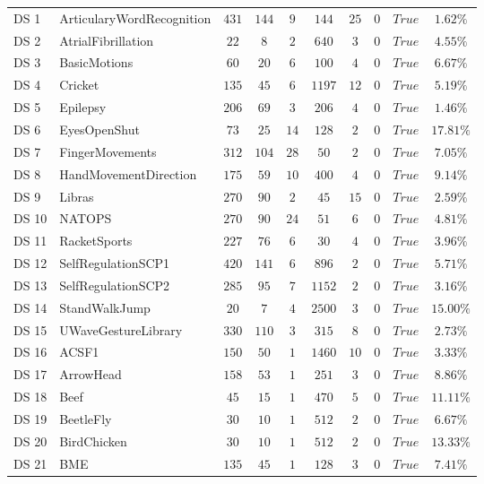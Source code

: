 {\begin{longtable}{|ll|cccccccc|}
		DS 1 & ArticularyWordRecognition & $431$ & $144$ & $9$ & $144$ & $25$ & $0$ & $True$ & $1.62\%$ \\
		DS 2 & AtrialFibrillation & $22$ & $8$ & $2$ & $640$ & $3$ & $0$ & $True$ & $4.55\%$ \\
		DS 3 & BasicMotions & $60$ & $20$ & $6$ & $100$ & $4$ & $0$ & $True$ & $6.67\%$ \\
		DS 4 & Cricket & $135$ & $45$ & $6$ & $1197$ & $12$ & $0$ & $True$ & $5.19\%$ \\
		DS 5 & Epilepsy & $206$ & $69$ & $3$ & $206$ & $4$ & $0$ & $True$ & $1.46\%$ \\
		DS 6 & EyesOpenShut & $73$ & $25$ & $14$ & $128$ & $2$ & $0$ & $True$ & $17.81\%$ \\
		DS 7 & FingerMovements & $312$ & $104$ & $28$ & $50$ & $2$ & $0$ & $True$ & $7.05\%$ \\
		DS 8 & HandMovementDirection & $175$ & $59$ & $10$ & $400$ & $4$ & $0$ & $True$ & $9.14\%$ \\
		DS 9 & Libras & $270$ & $90$ & $2$ & $45$ & $15$ & $0$ & $True$ & $2.59\%$ \\
		DS 10 & NATOPS & $270$ & $90$ & $24$ & $51$ & $6$ & $0$ & $True$ & $4.81\%$ \\
		DS 11 & RacketSports & $227$ & $76$ & $6$ & $30$ & $4$ & $0$ & $True$ & $3.96\%$ \\
		DS 12 & SelfRegulationSCP1 & $420$ & $141$ & $6$ & $896$ & $2$ & $0$ & $True$ & $5.71\%$ \\
		DS 13 & SelfRegulationSCP2 & $285$ & $95$ & $7$ & $1152$ & $2$ & $0$ & $True$ & $3.16\%$ \\
		DS 14 & StandWalkJump & $20$ & $7$ & $4$ & $2500$ & $3$ & $0$ & $True$ & $15.00\%$ \\
		DS 15 & UWaveGestureLibrary & $330$ & $110$ & $3$ & $315$ & $8$ & $0$ & $True$ & $2.73\%$ \\
		DS 16 & ACSF1 & $150$ & $50$ & $1$ & $1460$ & $10$ & $0$ & $True$ & $3.33\%$ \\
		DS 17 & ArrowHead & $158$ & $53$ & $1$ & $251$ & $3$ & $0$ & $True$ & $8.86\%$ \\
		DS 18 & Beef & $45$ & $15$ & $1$ & $470$ & $5$ & $0$ & $True$ & $11.11\%$ \\
		DS 19 & BeetleFly & $30$ & $10$ & $1$ & $512$ & $2$ & $0$ & $True$ & $6.67\%$ \\
		DS 20 & BirdChicken & $30$ & $10$ & $1$ & $512$ & $2$ & $0$ & $True$ & $13.33\%$ \\
		DS 21 & BME & $135$ & $45$ & $1$ & $128$ & $3$ & $0$ & $True$ & $7.41\%$ \\

\end{longtable}}
